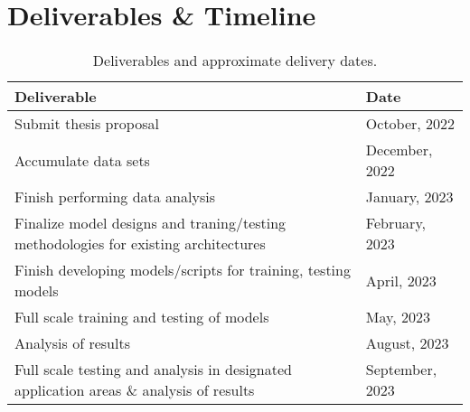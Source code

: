 \documentclass[10pt]{article}
\begin{document}
    \section{Deliverables \& Timeline}
        \begin{table}[h!]
            \centering
            \begin{tabular}{l|l}
                \textbf{Deliverable} & \textbf{Date} \\
                \hline
                Submit thesis proposal & October, 2022 \\
                Accumulate data sets\footnotemark[4] & December, 2022 \\
                Finish performing data analysis\footnotemark[5] & January, 2023 \\
                Finalize model designs and traning/testing methodologies for existing architectures & February, 2023 \\
                Finish developing models/scripts for training, testing models & April, 2023 \\
                Full scale training and testing of models & May, 2023 \\
                Analysis of results\footnotemark[6] & August, 2023 \\
                Full scale testing and analysis in designated application areas \& analysis of results & September, 2023 \\
            \end{tabular}
            \label{table:timeline}
            \caption{Deliverables and approximate delivery dates.}
        \end{table}

    \newpage
    
    
\end{document}
